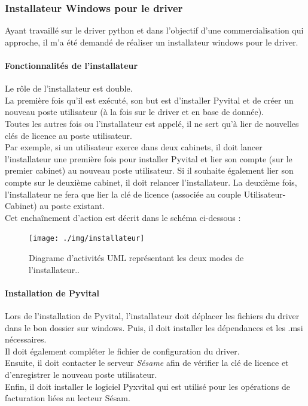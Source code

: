 \subsubsection{Installateur Windows pour le driver}
Ayant travaillé sur le driver python et dans l'objectif d'une commercialisation qui approche, il m'a été demandé de réaliser un installateur windows pour le driver.

\paragraph*{Fonctionnalités de l'installateur\\}
Le rôle de l'installateur est double.\\ 
La première fois qu'il est exécuté, son but est d'installer Pyvital et de créer un nouveau poste utilisateur (à la fois sur le driver et en base de donnée). \\
Toutes les autres fois ou l'installateur est appelé, il ne sert qu'à lier de nouvelles clés de licence au poste utilisateur.\\
Par exemple, si un utilisateur exerce dans deux cabinets, il doit lancer l'installateur une première fois pour installer Pyvital et lier son compte (sur le premier cabinet) au nouveau poste utilisateur.
Si il souhaite également lier son compte sur le deuxième cabinet, il doit relancer l'installateur. La deuxième fois, l'installateur ne fera que lier la clé de licence (associée au couple Utilisateur-Cabinet) au poste existant.\\
Cet enchaînement d'action est décrit dans le schéma ci-dessous : 
\begin{figure}[H]
  \vspace{0pt}
  \centering
  \texttt{[image: ./img/installateur]}
  \caption{\label{fig:installateur} Diagrame d'activités UML représentant les deux modes de l'installateur..}
\end{figure}

\paragraph*{Installation de Pyvital}
Lors de l'installation de Pyvital, l'installateur doit déplacer les fichiers du driver dans le bon dossier sur windows. Puis, il doit installer les dépendances et les .msi nécessaires.\\ 
Il doit également compléter le fichier de configuration du driver. \\
Ensuite, il doit contacter le serveur \textit{Sésame} afin de vérifier la clé de licence et d'enregistrer le nouveau poste utilisateur. \\
Enfin, il doit installer le logiciel Pyxvital qui est utilisé pour les opérations de facturation liées au lecteur Sésam.

